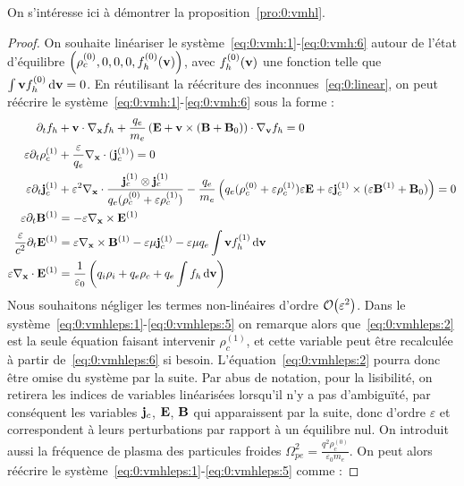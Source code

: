 On s'intéresse ici à démontrer la proposition~\ref{pro:0:vmhl}.
\begin{proof}
  On souhaite linéariser le système~\eqref{eq:0:vmh:1}-\eqref{eq:0:vmh:6} autour de l'état d'équilibre $\left(\rho_c^{(0)},0,0,0,f_h^{(0)}(\vb{v})\right)$, avec $f_h^{(0)}(\vb{v})$ une fonction telle que $\int\vb{v}f_h^{(0)}\dd{\vb{v}} = 0$. En réutilisant la réécriture des inconnues~\eqref{eq:0:linear}, on peut réécrire le système~\eqref{eq:0:vmh:1}-\eqref{eq:0:vmh:6} sous la forme :
  \begin{align}
    \label{eq:0:vmhleps:1}
      \partial_t f_h &+ \vb{v}\cdot\nabla_{\vb{x}} f_h + \frac{q_e}{m_e}\left( \vb{E} + \vb{v}\times(\vb{B}+\vb{B}_0) \right)\cdot\nabla_{\vb{v}} f_h = 0 \\
    \label{eq:0:vmhleps:2}
      \varepsilon\partial_t\rho_c^{(1)} &+ \frac{\varepsilon}{q_e}\nabla_{\vb{x}}\cdot(\vb{j}_c^{(1)}) = 0 \\
    \label{eq:0:vmhleps:3}
      \varepsilon\partial_t\vb{j}_c^{(1)} &+ \varepsilon^2\nabla_{\vb{x}}\cdot\frac{\vb{j}_c^{(1)}\otimes\vb{j}_c^{(1)}}{q_e(\rho_c^{(0)}+\varepsilon\rho_c^{(1)})} - \frac{q_e}{m_e}\left( q_e(\rho_c^{(0)}+\varepsilon\rho_c^{(1)})\varepsilon\vb{E} + \varepsilon\vb{j}_c^{(1)}\times(\varepsilon\vb{B}^{(1)}+\vb{B}_0) \right) = 0 \\
    \label{eq:0:vmhleps:4}
      \varepsilon\partial_t\vb{B}^{(1)} &= - \varepsilon\nabla_{\vb{x}}\times\vb{E}^{(1)} \\
    \label{eq:0:vmhleps:5}
      \frac{\varepsilon}{c^2}\partial_t\vb{E}^{(1)} &= \varepsilon\nabla_{\vb{x}}\times \vb{B}^{(1)} - \varepsilon\mu\vb{j}_c^{(1)} - \varepsilon\mu q_e\int \vb{v} f_h^{(1)}\dd{\vb{v}} \\
    \label{eq:0:vmhleps:6}
      \varepsilon\nabla_{\vb{x}}\cdot\vb{E}^{(1)} &= \frac{1}{\varepsilon_0}\left( q_i\rho_i + q_e\rho_c + q_e\int f_h\dd{\vb{v}} \right)
  \end{align}
  Nous souhaitons négliger les termes non-linéaires d'ordre $\order{\varepsilon^2}$. Dans le système~\eqref{eq:0:vmhleps:1}-\eqref{eq:0:vmhleps:5} on remarque alors que~\eqref{eq:0:vmhleps:2} est la seule équation faisant intervenir $\rho_c^{(1)}$, et cette variable peut être recalculée à partir de~\eqref{eq:0:vmhleps:6} si besoin. L'équation~\eqref{eq:0:vmhleps:2} pourra donc être omise du système par la suite. Par abus de notation, pour la lisibilité, on retirera les indices de variables linéarisées lorsqu'il n'y a pas d'ambiguïté, par conséquent les variables $\vb{j}_c$, $\vb{E}$, $\vb{B}$ qui apparaissent par la suite, donc d'ordre $\varepsilon$ et correspondent à leurs perturbations par rapport à un équilibre nul. On introduit aussi la fréquence de plasma des particules froides $\Omega_{pe}^2 = \frac{q^2\rho_c^{(0)}}{\varepsilon_0m_e}$. On peut alors réécrire le système~\eqref{eq:0:vmhleps:1}-\eqref{eq:0:vmhleps:5} comme :

\end{proof}
